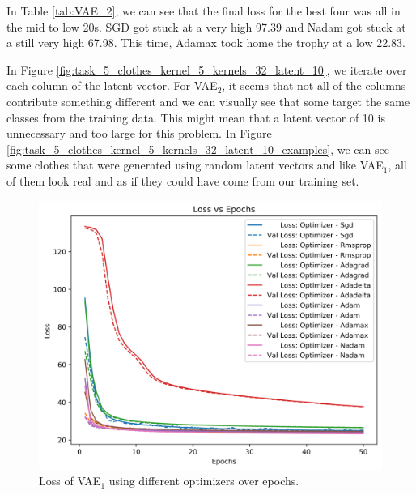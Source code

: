 \documentclass[12pt]{article}
\begin{document}
In Table \ref{tab:VAE_2}, we can see that the final loss for the best four was all in the mid to low 20s.
SGD got stuck at a very high 97.39 and Nadam got stuck at a still very high 67.98.
This time, Adamax took home the trophy at a low 22.83.

In Figure \ref{fig:task_5_clothes_kernel_5_kernels_32_latent_10}, we iterate over each column of the latent vector.
For VAE$_2$, it seems that not all of the columns contribute something different and we can visually see that some target the
 same classes from the training data.
This might mean that a latent vector of 10 is unnecessary and too large for this problem.
In Figure \ref{fig:task_5_clothes_kernel_5_kernels_32_latent_10_examples}, we can see some clothes that were
 generated using random latent vectors and like VAE$_1$, all of them look real and as if they could have come from our training set.

\begin{figure}
  \centering
  \includegraphics[width=\linewidth]{task_5_loss_epochs.png}
  \caption{Loss of VAE$_1$ using different optimizers over epochs.}
  \label{fig:task_5_loss_epochs_1}
\end{figure}
\end{document}
